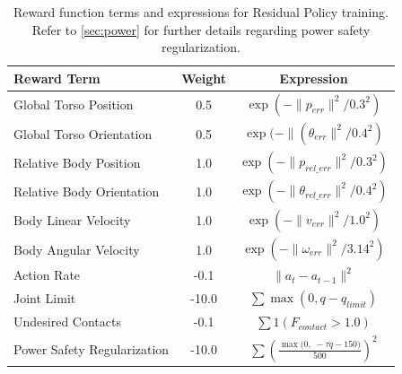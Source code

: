 

\begin{table}[t]
\centering
\caption{Reward function terms and expressions for Residual Policy training. Refer to \cref{sec:power} for further details regarding power safety regularization.}
\label{tab:reward_params}
\begin{tabular}{@{}lcc@{}}
\toprule
\textbf{Reward Term} & \textbf{Weight} & \textbf{Expression} \\ \midrule
Global Torso Position & 0.5 & $\exp(-\|p_{err}\|^2 / 0.3^2)$ \\
Global Torso Orientation & 0.5 & $\exp(-\|(\theta_{err}\|^2 / 0.4^2)$ \\
Relative Body Position & 1.0 & $\exp(-\|p_{rel\_err}\|^2 / 0.3^2)$ \\
Relative Body Orientation & 1.0 & $\exp(-\|\theta_{rel\_err}\|^2 / 0.4^2)$ \\
Body Linear Velocity & 1.0 & $\exp(-\|v_{err}\|^2 / 1.0^2)$ \\
Body Angular Velocity & 1.0 & $\exp(-\|\omega_{err}\|^2 / 3.14^2)$ \\
Action Rate & -0.1 & $\|a_{t} - a_{t-1}\|^2$ \\
Joint Limit & -10.0 & $\sum \max(0, q - q_{limit})$ \\
Undesired Contacts & -0.1 & $\sum 1(F_{contact} > 1.0)$ \\
Power Safety Regularization& -10.0 &  $\sum \left(\frac{\max\!\bigl(0,\; - \tau \dot{q}- 150\bigr)}{500}\right)^{\!2}$ \\
\bottomrule
\end{tabular}
\end{table}